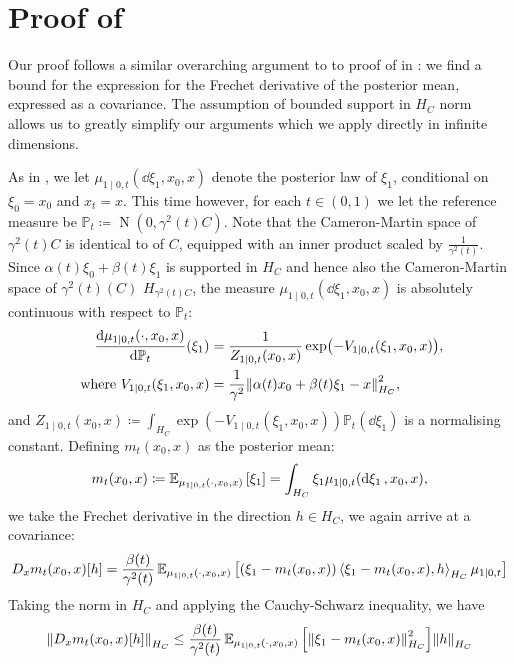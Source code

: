 \section{Proof of }
Our proof follows a similar overarching argument to to proof of  in : we find a bound for the expression for the Frechet derivative of the posterior mean, expressed as a covariance. The assumption of bounded support in \(H_{C}\) norm allows us to greatly simplify our arguments which we apply directly in infinite dimensions.

As in , we let \(\mu_{1 \mid 0, t}(\dd{\xi_{1}}, x_{0}, x)\) denote the posterior law of \(\xi_{1}\), conditional on \(\xi_{0} = x_{0}\) and \(x_{t} = x\). This time however, for each \(t \in (0, 1)\) we let the reference measure be \(\mathbb{P}_{t} \coloneqq \operatorname{N}(0, \gamma^{2}(t) C)\). Note that the Cameron-Martin space of \(\gamma^{2}(t)C\) is identical to of \(C\), equipped with an inner product scaled by \(\frac{1}{\gamma^{2}(t)}\). Since \(\alpha(t)\xi_{0} + \beta(t) \xi_{1}\) is supported in \(H_{C}\) and hence also the Cameron-Martin space of \(\gamma^{2}(t)(C)\) \(H_{\gamma^{2}(t)C}\), the measure \(\mu_{1 \mid 0, t}(\dd{\xi_{1}}, x_{0}, x)\) is absolutely continuous with respect to \(\mathbb{P}_{t}\):
\begin{align*}
  \dv{\mu_{1 \mid 0, t}(\cdot, x_{0}, x)}{\mathbb{P}_{t}}{}(\xi_{1}) &= \frac{1}{Z_{1 \mid 0, t}(x_{0}, x)}\exp(-V_{1 \mid 0, t}(\xi_{1}, x_{0}, x)), \\
  \text{ where } V_{1 \mid 0, t}(\xi_{1}, x_{0}, x) &= \frac{1}{\gamma^{2}} \norm{\alpha(t) x_{0} + \beta(t) \xi_{1} - x}_{H_{C}}^{2},
\end{align*}
and \(Z_{1 \mid 0, t}(x_{0}, x) \coloneqq \int_{H_{C}} \exp(-V_{1 \mid 0, t}(\xi_{1}, x_{0}, x)) \mathbb{P}_{t}(\dd{\xi_{1}})\) is a normalising constant. Defining \(m_{t}(x_{0}, x)\) as the posterior mean:
\[
  m_{t}(x_{0}, x) \coloneqq \mathop{\mathbb{E}_{\mu_{1 \mid 0, t}(\cdot, x_{0}, x)}}\qty[\xi_{1}] = \int_{H_{C}} \xi_{1} \mu_{1 \mid 0, t}(\dd{\xi_{1}}, x_{0}, x),
\]
we take the Frechet derivative in the direction \(h \in H_{C}\), we again arrive at a covariance:
\[
  D_{x} m_{t}(x_{0}, x)[h] = \frac{\beta(t)}{\gamma^{2}(t)} \mathop{\mathbb{E}_{\mu_{1 \mid 0, t}(\cdot, x_{0}, x)}}\qty[ (\xi_{1} - m_{t}(x_{0}, x))\ev{\xi_{1} - m_{t}(x_{0}, x), h}_{H_{C}} \mu_{1 \mid 0, t}]
\]
Taking the norm in \(H_{C}\) and applying the Cauchy-Schwarz inequality, we have
\[
  \norm{D_{x} m_{t}(x_{0}, x)[h]}_{H_{C}} \leq \frac{\beta(t)}{\gamma^{2}(t)} \mathop{\mathbb{E}_{\mu_{1 \mid 0, t}(\cdot, x_{0}, x)}}\qty[\norm{\xi_{1} - m_{t}(x_{0}, x)}_{H_{C}}^{2}] \norm{h}_{H_{C}}
\]
